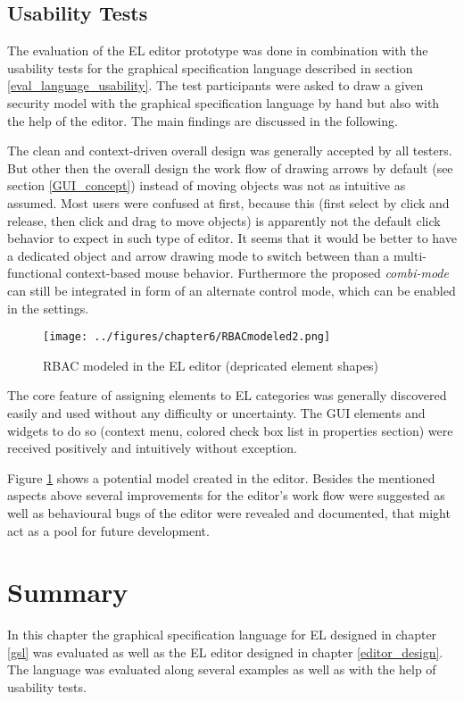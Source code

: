 \documentclass[twoside, openright, 12pt]{book}
\begin{document}
\subsection{Usability Tests}
\label{eval_editor_usability}
The evaluation of the EL editor prototype was done in combination with the usability tests for the graphical specification language described in section \ref{eval_language_usability}.
The test participants were asked to draw a given security model with the graphical specification language by hand but also with the help of the editor.
The main findings are discussed in the following.

The clean and context-driven overall design was generally accepted by all testers. 
But other then the overall design the work flow of drawing arrows by default (see section \ref{GUI_concept}) instead of moving objects was not as intuitive as assumed.
Most users were confused at first, because this (first select by click and release, then click and drag to move objects) is apparently not the default click behavior to expect in such type of editor.
It seems that it would be better to have a dedicated object and arrow drawing mode to switch between than a multi-functional context-based mouse behavior.
Furthermore the proposed \textit{combi-mode} can still be integrated in form of an alternate control mode, which can be enabled in the settings.

\begin{figure}[bht]
	\centering
	\texttt{[image: ../figures/chapter6/RBACmodeled2.png]}
	\caption{RBAC modeled in the EL editor (depricated element shapes)}
	\label{fig:RBACmodeled2}
\end{figure}

The core feature of assigning elements to EL categories was generally discovered easily and used without any difficulty or uncertainty.
The GUI elements and widgets to do so (context menu, colored check box list in properties section) were received positively and intuitively without exception.

Figure \ref{fig:RBACmodeled2} shows a potential model created in the editor.
Besides the mentioned aspects above several improvements for the editor's work flow were suggested as well as behavioural bugs of the editor were revealed and documented, that might act as a pool for future development.



\section{Summary}
\label{eval_summary}
In this chapter the graphical specification language for EL designed in chapter \ref{gsl} was evaluated as well as the EL editor designed in chapter \ref{editor_design}.
The language was evaluated along several examples as well as with the help of usability tests.
\end{document}

